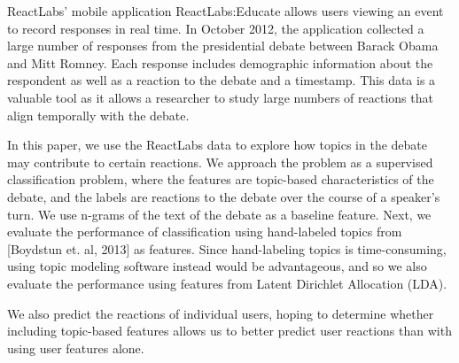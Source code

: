 
ReactLabs' mobile application ReactLabs:Educate allows users viewing an event to record responses in real time. In October 2012, the application collected a large number of responses from the presidential debate between Barack Obama and Mitt Romney. Each response includes demographic information about the respondent as well as a reaction to the debate and a timestamp. This data is a valuable tool as it allows a researcher to study large numbers of reactions that align temporally with the debate.

In this paper, we use the ReactLabs data to explore how topics in the debate may contribute to certain reactions. We approach the problem as a supervised classification problem, where the features are topic-based characteristics of the debate, and the labels are reactions to the debate over the course of a speaker's turn. We use n-grams of the text of the debate as a baseline feature. Next, we evaluate the performance of classification using hand-labeled topics from [Boydstun et. al, 2013] as features. Since hand-labeling topics is time-consuming, using topic modeling software instead would be advantageous, and so we also evaluate the performance using features from Latent Dirichlet Allocation (LDA).

We also predict the reactions of individual users, hoping to determine whether including topic-based features allows us to better predict user reactions than with using user features alone.